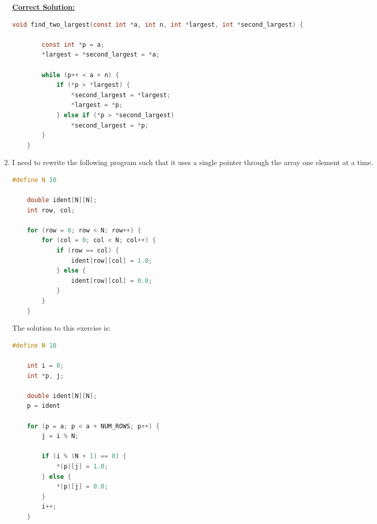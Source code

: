 \documentclass[12pt]{article}
\begin{document}
\begin{enumerate}[1.]
    \bigskip

    \begin{mdframed}

    \underline{\textbf{Correct Solution:}}

    \bigskip

\begin{lstlisting}[language=c]
    void find_two_largest(const int *a, int n, int *largest, int *second_largest) {

        const int *p = a;
        *largest = *second_largest = *a;

        while (p++ < a + n) {
            if (*p > *largest) {
                *second_largest = *largest;
                *largest = *p;
            } else if (*p > *second_largest)
                *second_largest = *p;
        }
    }
\end{lstlisting}

    \end{mdframed}

    \item

    I need to rewrite the following program such that it uses a single pointer through
    the array one element at a time.

    \bigskip

\begin{lstlisting}[language=c]
    #define N 10

    double ident[N][N];
    int row, col;

    for (row = 0; row < N; row++) {
        for (col = 0; col < N; col++) {
            if (row == col) {
                ident[row][col] = 1.0;
            } else {
                ident[row][col] = 0.0;
            }
        }
    }
\end{lstlisting}

    \bigskip

    The solution to this exercise is:

    \bigskip

\begin{lstlisting}[language=c]
    #define N 10

    int i = 0;
    int *p, j;

    double ident[N][N];
    p = ident

    for (p = a; p < a + NUM_ROWS; p++) {
        j = i % N;

        if (i % (N + 1) == 0) {
            *(p)[j] = 1.0;
        } else {
            *(p)[j] = 0.0;
        }
        i++;
    }
\end{lstlisting}



\end{enumerate}
\end{document}
